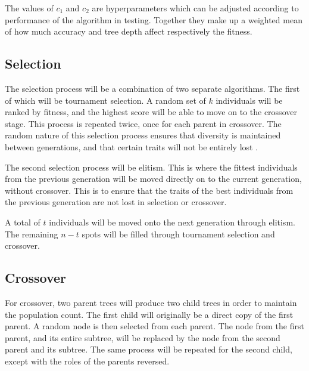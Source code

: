 \documentclass[12pt]{article}
\begin{document}
The values of $c_1$ and $c_2$ are hyperparameters which can be adjusted according to performance of the algorithm in testing. Together they make up a weighted mean of how much accuracy and tree depth affect respectively the fitness.

\subsection{Selection}

The selection process will be a combination of two separate algorithms. The first of which will be tournament selection. A random set of $k$ individuals will be ranked by fitness, and the highest score will be able to move on to the crossover stage. This process is repeated twice, once for each parent in crossover. The random nature of this selection process ensures that diversity is maintained between generations, and that certain traits will not be entirely lost \cite{blickle_1997}.

The second selection process will be elitism. This is where the fittest individuals from the previous generation will be moved directly on to the current generation, without crossover. This is to ensure that the traits of the best individuals from the previous generation are not lost in selection or crossover.

A total of $t$ individuals will be moved onto the next generation through elitism. The remaining $n - t$ spots will be filled through tournament selection and crossover.

\subsection{Crossover}

For crossover, two parent trees will produce two child trees in order to maintain the population count. The first child will originally be a direct copy of the first parent. A random node is then selected from each parent. The node from the first parent, and its entire subtree, will be replaced by the node from the second parent and its subtree. The same process will be repeated for the second child, except with the roles of the parents reversed.
\end{document}
